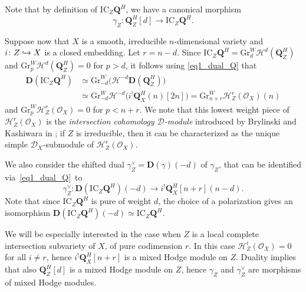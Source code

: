 \documentclass[11pt]{article}
\numberwithin{equation}{section}
\newcommand\hto{\mathrel{\lhook\joinrel\to}}
\theoremstyle{plain}
\theoremstyle{definition}
\newcommand\Q{{\mathbf Q}}
\newcommand\cD{\mathcal{D}}
\newcommand\cH{\mathcal{H}}
\newcommand\cO{\mathcal{O}}
\newcommand\cH{\mathcal{H}}
\newcommand\cO{\mathcal{O}}
\newcommand\gr{\mathrm{Gr}}
\begin{document}
Note that by definition of $\mathrm{IC}_Z\Q^H$, we have a canonical morphism
\begin{equation}\label{def_gamma}
\gamma_Z\colon\Q_Z^H[d]\to \mathrm{IC}_Z\Q^H.
\end{equation}

Suppose now that $X$ is a smooth, irreducible $n$-dimensional variety and $i\colon Z\hto X$ is a closed embedding. Let $r\!=\!n-d$.
Since $\mathrm{IC}_Z\Q^H\!=\!\gr^W_d\cH^d(\Q_Z^H)$ and $\gr^W_p\cH^d(\Q_Z^H)\!=\!0$ for $p>d$, it follows using \eqref{eq1_dual_Q} that
\begin{equation}\label{eq_dual_IC}
\begin{aligned}
{\mathbf D}(\mathrm{IC}_Z\Q^H)&\simeq\gr^W_{-d}\big(\cH^{-d}{\mathbf D}(\Q_Z^H)\big)\\
&\simeq\gr^W_{-d}\cH^{-d}\big(i^!\Q_X^H(n)[2n]\big)=\gr^W_{n+r}\cH^r_Z(\cO_X)(n)
\end{aligned}
\end{equation}
and $\gr^W_p\cH^r_Z(\cO_X)=0$ for $p<n+r$. We note that this lowest
weight piece of $\cH^r_Z(\cO_X)$ is the \emph{intersection cohomology $\cD$-module} introduced by Brylinski and Kashiwara in \cite{BK};
if $Z$ is irreducible, then it can be characterized as the unique simple $\cD_X$\nobreakdash-sub\-module of $\cH^r_Z(\cO_X)$.

We also consider the shifted dual $\gamma_Z^{\vee}={\mathbf D}(\gamma)(-d)$ of $\gamma_Z$, that can be identified via~\eqref{eq1_dual_Q}~to
\begin{equation}\label{def_gamma_2}
\gamma_Z^{\vee}\colon {\mathbf D}(\mathrm{IC}_Z\Q^H)(-d)\to i^!\Q_X^H[n+r](n-d).
\end{equation}
Note that since $\mathrm{IC}_Z\Q^H$ is pure of weight $d$, the choice of a polarization gives an isomorphism
${\mathbf D}(\mathrm{IC}_Z\Q^H)(-d)\simeq \mathrm{IC}_Z\Q^H$.

We will be especially interested in the case when $Z$ is a local complete intersection subvariety of $X$, of pure codimension $r$.
In this case $\cH^i_Z(\cO_X)=0$ for all $i\neq r$, hence $i^!\Q_X^H[n+r]$ is a mixed Hodge module on $Z$. Duality implies that
also $\Q_Z^H[d]$ is a mixed Hodge module on $Z$, hence $\gamma_Z$ and $\gamma_Z^{\vee}$ are morphisms of mixed Hodge
modules.
\end{document}
